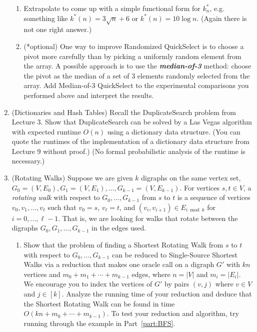 \documentclass[11pt]{article}
\begin{document}
\begin{enumerate}
\begin{enumerate}
        \item Extrapolate to come up with a simple functional form for $k^*_n$, e.g. something like $k^*(n)=3\sqrt{n}+6$ or $k^*(n)=10\log n$. (Again there is not one right answer.)

        \item (*optional)  One way to improve Randomized QuickSelect is to choose a pivot more carefully than by picking a uniformly random element from the array. A possible approach is to use the \textit{\textbf{median-of-3}} method: choose the pivot as the median of a set of 3 elements randomly selected from the array. Add Median-of-3 QuickSelect to the experimental comparisons you performed above and interpret the results.

    \end{enumerate}


    \item (Dictionaries and Hash Tables) 
    Recall the DuplicateSearch problem from Lecture 3. Show that DuplicateSearch can be solved by a Las Vegas algorithm with expected runtime $O(n)$ using a dictionary data structure.  (You can quote the runtimes of the implementation of a dictionary data structure from Lecture 9 without proof.) (No formal probabilistic analysis of the runtime is necessary.)

    \item  (Rotating Walks)  
    Suppose we are given $k$ digraphs on the same vertex set, $G_0=(V,E_0), G_1=(V,E_1), \ldots, G_{k-1}=(V,E_{k-1})$.  For vertices $s,t\in V$, a {\em rotating walk} with respect to $G_0,\ldots,G_{k-1}$ from $s$ to $t$ is a sequence of vertices $v_0,v_1,\ldots,v_{\ell}$ such that $v_0=s$, $v_\ell=t$, and $(v_i,v_{i+1})\in E_{i \bmod k}$ for $i=0,\ldots,\ell-1$.  That is, we are looking for walks that rotate between the digraphs $G_0,G_1,\ldots,G_{k-1}$ in the edges used.
    \begin{enumerate}
        \item Show that the problem of finding a Shortest Rotating Walk from $s$ to $t$ with respect to $G_0,\ldots,G_{k-1}$ 
        can be reduced to Single-Source Shortest Walks via a reduction that makes one oracle call on 
        a digraph $G'$ with $kn$ vertices and $m_0+m_1+\cdots+m_{k-1}$ edges, where $n=|V|$ and $m_i=|E_i|$.
        We encourage you to index the vertices of $G'$ by pairs $(v,j)$ where $v\in V$ and $j\in [k]$. 
        Analyze the running time of your reduction and deduce that the Shortest Rotating Walk can be found in time $O(kn+m_0+\cdots+m_{k-1})$.
        \label{part:ReduceToOrdinary}  To test your reduction and algorithm, try running through the example in Part~\ref{part:BFS}.


\end{enumerate}
\end{enumerate}
\end{document}
